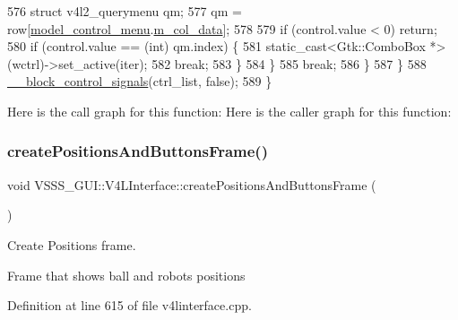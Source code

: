 \begin{DoxyCode}
576                         \textcolor{keyword}{struct }v4l2\_querymenu qm;
577                         qm = row[\hyperlink{class_v_s_s_s___g_u_i_1_1_v4_l_interface_ac98e20c4b2875e7137f867b3da753640}{model\_control\_menu}.\hyperlink{class_v_s_s_s___g_u_i_1_1_v4_l_interface_1_1_model_column_aa6720e1b3e47adb85d36c3ec3a2bb262}{m\_col\_data}];
578 
579                         \textcolor{keywordflow}{if} (control.value < 0) \textcolor{keywordflow}{return};
580                         \textcolor{keywordflow}{if} (control.value == (\textcolor{keywordtype}{int}) qm.index) \{
581                             \textcolor{keyword}{static\_cast<}Gtk::ComboBox *\textcolor{keyword}{>}(wctrl)->set\_active(iter);
582                             \textcolor{keywordflow}{break};
583                         \}
584                     \}
585                     \textcolor{keywordflow}{break};
586                 \}
587         \}
588         \hyperlink{class_v_s_s_s___g_u_i_1_1_v4_l_interface_a677d3f2d0246528bafd19cf2d3dccf98}{\_\_block\_control\_signals}(ctrl\_list, \textcolor{keyword}{false});
589     \}
\end{DoxyCode}
Here is the call graph for this function\+:
Here is the caller graph for this function\+:
\mbox{\label{class_v_s_s_s___g_u_i_1_1_v4_l_interface_ab9798615f93d2e1272a10891e7d57219}} 
\subsubsection{\texorpdfstring{create\+Positions\+And\+Buttons\+Frame()}{createPositionsAndButtonsFrame()}}
{\footnotesize\ttfamily void V\+S\+S\+S\+\_\+\+G\+U\+I\+::\+V4\+L\+Interface\+::create\+Positions\+And\+Buttons\+Frame (\begin{DoxyParamCaption}{ }\end{DoxyParamCaption})}



Create Positions frame. 

Frame that shows ball and robots positions 

Definition at line 615 of file v4linterface.\+cpp.



